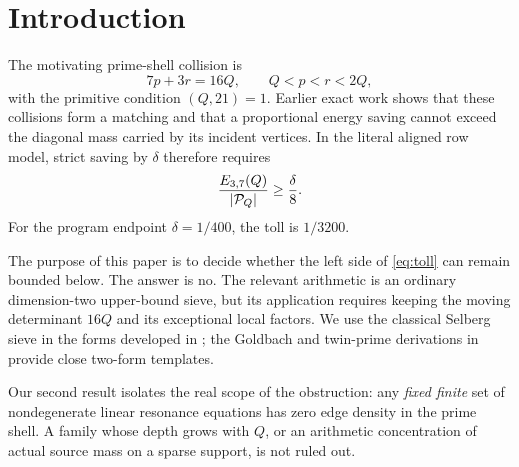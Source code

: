 \section{Introduction}

The motivating prime-shell collision is
\begin{equation}
 7p+3r=16Q,\qquad Q<p<r<2Q,                         \label{eq:resonance}
\end{equation}
with the primitive condition $(Q,21)=1$.  Earlier exact work shows that these
collisions form a matching and that a proportional energy saving cannot exceed the
diagonal mass carried by its incident vertices.  In the literal aligned row model,
strict saving by $\delta$ therefore requires
\begin{equation}
 \frac{E_{3,7}(Q)}{|\mathcal P_Q|}\ge \frac{\delta}{8}.     \label{eq:toll}
\end{equation}
For the program endpoint $\delta=1/400$, the toll is $1/3200$.

The purpose of this paper is to decide whether the left side of
\eqref{eq:toll} can remain bounded below.  The answer is no.  The relevant arithmetic
is an ordinary dimension-two upper-bound sieve, but its application requires keeping
the moving determinant $16Q$ and its exceptional local factors.  We use the classical
Selberg sieve in the forms developed in \cite{HalberstamRichert1974,IwaniecKowalski2004};
the Goldbach and twin-prime derivations in \cite{GreenAdditive,Rudnick2015} provide
close two-form templates.

Our second result isolates the real scope of the obstruction: any \emph{fixed finite}
set of nondegenerate linear resonance equations has zero edge density in the prime
shell.  A family whose depth grows with $Q$, or an arithmetic concentration of actual
source mass on a sparse support, is not ruled out.
